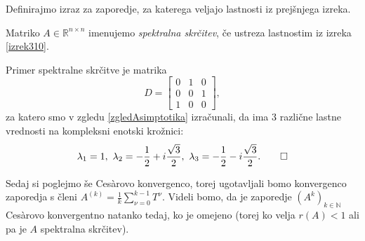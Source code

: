 \documentclass[mat1]{fmfdelo}
\newcommand{\R}{\mathbb R}
\newcommand{\N}{\mathbb N}
\begin{document}
Definirajmo izraz za zaporedje, za katerega veljajo lastnosti iz prejšnjega izreka.
\begin{definicija}
    Matriko $A \in \R^{n \times n}$ imenujemo \emph{spektralna skrčitev}, če ustreza lastnostim iz izreka \ref{izrek310}.
\end{definicija}
\begin{zgled}
    Primer spektralne skrčitve je matrika
    \begin{equation*}
        D =
        \begin{bmatrix}
            0 & 1 & 0 \\
            0 & 0 & 1 \\
            1 & 0 & 0
        \end{bmatrix},
    \end{equation*}
    za katero smo v zgledu \ref{zgledAsimptotika} izračunali, da ima $3$ različne lastne vrednosti na kompleksni enotski krožnici: \[\lambda_1=1,\ \lambda_2 = - \frac{1}{2} + i\frac{\sqrt{3}}{2},\ \lambda_3 = - \frac{1}{2} - i\frac{\sqrt{3}}{2}. \qedhere\]
\end{zgled}
Sedaj si poglejmo še Ces\`arovo konvergenco, torej ugotavljali bomo konvergenco zaporedja s členi $A^{(k)} = \frac{1}{k} \sum_{\nu=0}^{k-1} T^\nu$. Videli bomo, da je zaporedje $(A^k)_{k\in\N}$ Ces\`arovo konvergentno natanko tedaj, ko je omejeno (torej ko velja $r(A) < 1$ ali pa je $A$ spektralna skrčitev).
\end{document}
